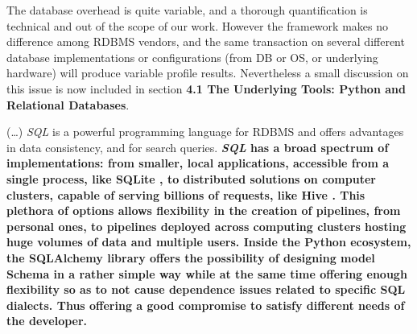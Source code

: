 \documentclass[a4paper,onecolumn,fleqn,usenatbib,useAMS]{mnrasr}
\newenvironment{frshaded}{%
\def\FrameCommand{\fboxrule=\FrameRule\fboxsep=\FrameSep \fcolorbox{framecolor}{shadecolor}}%
\MakeFramed {\FrameRestore}}%
{\endMakeFramed}
\begin{document}
The database overhead is quite variable, and a thorough quantification
is technical and out of the scope of our work.
%
However the framework makes no difference among RDBMS vendors,
and the same transaction on several different database implementations
or configurations (from DB or OS, or underlying hardware) will
produce variable profile results.
%
Nevertheless a small discussion on this issue is now included in section 
\textbf{4.1 The Underlying Tools: Python and Relational Databases}.
\begin{frshaded}
\begin{multicols}{2} 
(\ldots)
\textit{SQL} is a powerful programming language for RDBMS 
and offers advantages in data consistency, and for search queries.
%
\bfseries
\textit{SQL} has a broad spectrum of implementations: from smaller,
local applications, accessible from a single process, like SQLite \citep{owens2010sqlite},
to distributed solutions on computer clusters, capable of serving billions of
requests, like Hive \citep{thusoo2009hive}.
%
This plethora of options allows flexibility in the creation of pipelines,
from personal ones, to pipelines deployed across computing clusters hosting
huge volumes of data and multiple users.
%
Inside the Python ecosystem, the SQLAlchemy library offers
the possibility of designing model Schema in a rather simple way 
while at the same time offering enough flexibility so as to not 
cause dependence issues related to specific SQL dialects. Thus 
offering a good compromise to satisfy different needs of the developer.
\mdseries
\end{multicols} \end{frshaded} 
\end{document}
